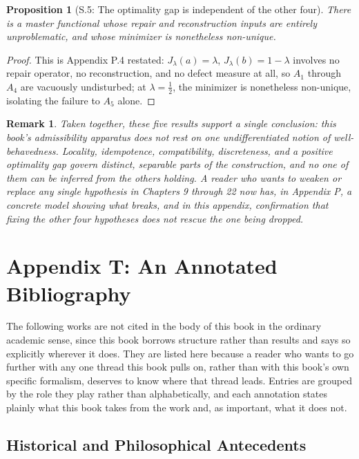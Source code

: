 \documentclass[11pt]{book}
\newtheorem*{appendixproposition}{Proposition}
\newtheorem*{appendixremark}{Remark}
\begin{document}
\begin{appendixproposition}[S.5: The optimality gap is independent of the other four]
There is a master functional whose repair and reconstruction inputs are entirely unproblematic, and whose minimizer is nonetheless non-unique.
\end{appendixproposition}

\begin{proof}
This is Appendix P.4 restated: $J_\lambda(a) = \lambda$, $J_\lambda(b) = 1-\lambda$ involves no repair operator, no reconstruction, and no defect measure at all, so $A_1$ through $A_4$ are vacuously undisturbed; at $\lambda = \tfrac12$, the minimizer is nonetheless non-unique, isolating the failure to $A_5$ alone.
\end{proof}

\begin{appendixremark}
Taken together, these five results support a single conclusion: this book's admissibility apparatus does not rest on one undifferentiated notion of well-behavedness. Locality, idempotence, compatibility, discreteness, and a positive optimality gap govern distinct, separable parts of the construction, and no one of them can be inferred from the others holding. A reader who wants to weaken or replace any single hypothesis in Chapters 9 through 22 now has, in Appendix P, a concrete model showing what breaks, and in this appendix, confirmation that fixing the other four hypotheses does not rescue the one being dropped.
\end{appendixremark}


\chapter*{Appendix T: An Annotated Bibliography}

The following works are not cited in the body of this book in the ordinary academic sense, since this book borrows structure rather than results and says so explicitly wherever it does. They are listed here because a reader who wants to go further with any one thread this book pulls on, rather than with this book's own specific formalism, deserves to know where that thread leads. Entries are grouped by the role they play rather than alphabetically, and each annotation states plainly what this book takes from the work and, as important, what it does not.

\section*{Historical and Philosophical Antecedents}
\end{document}
